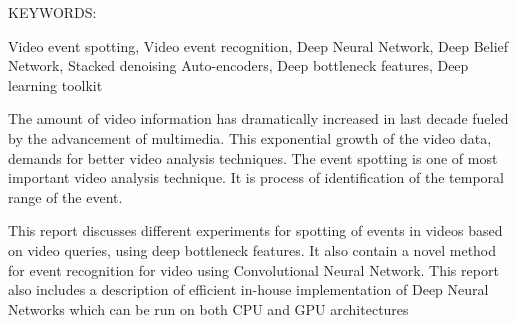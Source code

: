 \abstract

\noindent KEYWORDS: \hspace*{0.5em} \parbox[t]{4.4in}{Video event spotting, Video event recognition, Deep Neural Network, Deep Belief Network, Stacked denoising Auto-encoders, Deep bottleneck features, Deep learning toolkit }

\vspace*{24pt}

The amount of video information has dramatically increased in last decade fueled by the advancement of multimedia. This exponential growth of the video data, demands for better video analysis techniques. The event spotting is one of most important video analysis technique. It is process of identification of the temporal range of the event.

This report discusses different experiments for spotting of events in videos based on video queries, using deep bottleneck features. It also contain a novel method for event recognition for video using Convolutional Neural Network. This report also includes a description of efficient in-house implementation of Deep Neural Networks which can be run on both CPU and GPU architectures
\pagebreak